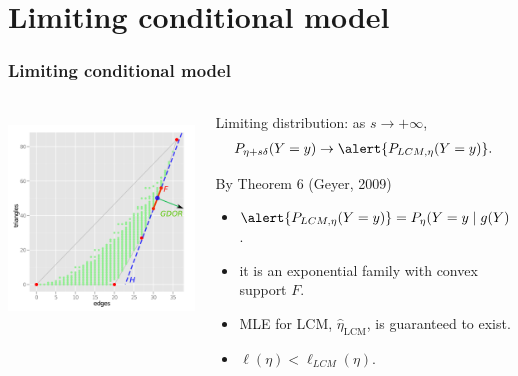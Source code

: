\documentclass[ 10pt]{beamer}
\newcommand{\etaLCM}{\hat{\eta}_{\textrm{LCM}}}
\begin{document}
\section{Limiting conditional model}
\frame
{
	\frametitle{Limiting conditional model}
\begin{columns}[]
\begin{column}[T]{0.25\textwidth}
\includegraphics[height=2.2in,trim=3.5in 2in 0.15in 0.05in,clip=true]{g9-H.png}
\end{column} %

\begin{column}[t]{0.75\textwidth}
Limiting distribution: as $s \to +\infty$,
\begin{align*}
P_{\eta + s \delta}( Y = y) \to \alert{P_{LCM, \eta}( Y = y)}.
\end{align*}

\begin{block}{
By Theorem 6 (Geyer, 2009)}
\begin{itemize}
	\item $\alert{P_{LCM, \eta}( Y = y)} = P_{\eta}( Y =y \mid g(Y) \in H)$.
\vspace{1mm}
	
	\item it is an exponential family with convex support $F$.
\vspace{1mm}

	\item MLE for LCM, $\etaLCM$, is guaranteed to exist.
\vspace{1mm}

	\item $\ell(\eta) < \ell_{LCM}(\eta)$.
\end{itemize}
\end{block}

\end{column}
\end{columns}
}
\end{document}
